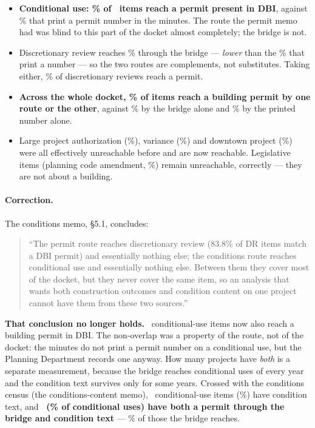 \documentclass[11pt]{article}
\begin{document}
\begin{itemize}
\item \textbf{Conditional use: \acqBridgeCU\% of \acqBridgeCUTotal\ items reach a permit
present in DBI}, against \acqPrintedCU\% that print a permit number in the minutes. The
route the permit memo had was blind to this part of the docket almost completely; the bridge
is not.
\item Discretionary review reaches \acqBridgeDR\% through the bridge --- \emph{lower} than the
\acqPrintedDR\% that print a number --- so the two routes are complements, not substitutes.
Taking either, \acqEitherDR\% of discretionary reviews reach a permit.
\item \textbf{Across the whole docket, \acqEitherRoute\% of items reach a building permit by
one route or the other}, against \acqBridgeDbiShare\% by the bridge alone and
\acqPrintedAll\% by the printed number alone.
\item Large project authorization (\acqBridgeLpa\%), variance (\acqBridgeVar\%) and
downtown project (\acqBridgeDnt\%) were all effectively unreachable before and are now
reachable. Legislative items (planning code amendment, \acqBridgePca\%) remain unreachable,
correctly --- they are not about a building.
\end{itemize}

\paragraph{Correction.} The conditions memo, \S5.1, concludes:

\begin{quote}\small
``The permit route reaches discretionary review (83.8\% of DR items match a DBI permit) and
essentially nothing else; the conditions route reaches conditional use and essentially nothing
else. Between them they cover most of the docket, but they never cover the same item, so an
analysis that wants both construction outcomes and condition content on one project cannot
have them from these two sources.''
\end{quote}

\noindent
\textbf{That conclusion no longer holds.} \acqBridgeCUN\ conditional-use items now also
reach a building permit in DBI. The non-overlap was a property of the route, not of the
docket: the minutes do not print a permit number on a conditional use, but the Planning
Department records one anyway. How many projects have \emph{both} is a separate measurement,
because the bridge reaches conditional uses of every year and the condition text survives only
for some years. Crossed with the conditions census (the conditions-content memo), \acqCondTextCU\
conditional-use items (\acqCondTextCUPct\%) have condition text, and \textbf{\acqOverlapCU\
(\acqOverlapCUPct\% of conditional uses) have both a permit through the bridge and condition
text} --- \acqOverlapOfBridge\% of those the bridge reaches.
\end{document}
